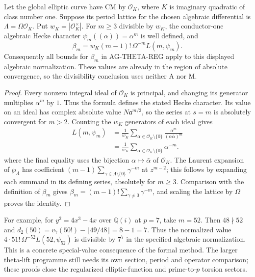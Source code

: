 \begin{proposition}
Let the global elliptic curve have CM by $\mathcal O_K$, where
$K$ is imaginary quadratic of class number one. Suppose its
period lattice for the chosen algebraic differential is
$\Lambda=\Omega\mathcal O_K$. Put
$w_K=|\mathcal O_K^\times|$. For $m\ge3$ divisible by $w_K$,
the conductor-one algebraic Hecke character
$\psi_m((\alpha))=\alpha^m$ is well defined, and
\[
 \beta_m=w_K(m-1)!\,\Omega^{-m} L(m,\psi_m).
\]
Consequently all bounds for $\beta_m$ in AG-THETA-REG apply
to this displayed algebraic normalization. These values are
already in the region of absolute convergence, so the
divisibility conclusion uses neither A nor M.
\end{proposition}
\begin{proof}
Every nonzero integral ideal of $\mathcal O_K$ is principal,
and changing its generator multiplies $\alpha^m$ by $1$.
Thus the formula defines the stated Hecke character. Its value
on an ideal has complex absolute value $N\mathfrak a^{m/2}$,
so the series at $s=m$ is absolutely convergent for $m>2$.
Counting the $w_K$ generators of each ideal gives
\[
 \begin{aligned}
 L(m,\psi_m)&=\frac1{w_K}
   \sum_{\alpha\in\mathcal O_K\setminus\{0\}}
          \frac{\alpha^m}{(\alpha\bar\alpha)^m}\\
  &=\frac1{w_K}
   \sum_{\alpha\in\mathcal O_K\setminus\{0\}}\alpha^{-m}.
 \end{aligned}
\]
where the final equality uses the bijection
$\alpha\mapsto\bar\alpha$ of $\mathcal O_K$.
The Laurent expansion of $\wp_\Lambda$ has coefficient
$(m-1)\sum_{\gamma\in\Lambda\setminus\{0\}}\gamma^{-m}$
at $z^{m-2}$; this follows by expanding each summand in its
defining series, absolutely for $m\ge3$.
Comparison with the definition of $\beta_m$ gives
$\beta_m=(m-1)!\sum_{\gamma\ne0}\gamma^{-m}$, and scaling
the lattice by $\Omega$ proves the identity.
\end{proof}

For example, for $y^2=4x^3-4x$ over $\mathbb Q(i)$ at $p=7$,
take $m=52$. Then $48\nmid52$ and
$d_2(50)=v_7(50!)-\lfloor49/48\rfloor=8-1=7$.
Thus the normalized value
$4\cdot51!\,\Omega^{-52}L(52,\psi_{52})$ is divisible by
$7^7$ in the specified algebraic normalization. This is a
concrete special-value consequence of the formal method.
The larger theta-lift programme still needs its own section,
period and operator comparison; these proofs close the
regularized elliptic-function and prime-to-$p$ torsion sectors.

